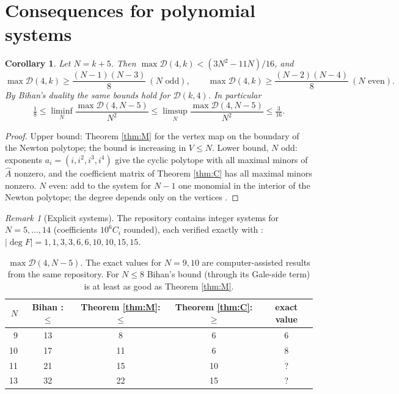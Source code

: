 \documentclass[11pt]{article}
\newtheorem{corollary}[theorem]{Corollary}
\theoremstyle{remark}
\newtheorem{remark}[theorem]{Remark}
\begin{document}
\section{Consequences for polynomial systems}
\begin{corollary}\label{cor}
Let $N=k+5$. Then $\max\mathcal D(4,k)<(3N^2-11N)/16$, and
\[
\max\mathcal D(4,k)\ge\frac{(N-1)(N-3)}{8}\ (N\text{ odd}),\qquad\max\mathcal D(4,k)\ge\frac{(N-2)(N-4)}{8}\ (N\text{ even}).
\]
By Bihan's duality \cite[Thm.~3]{B} the same bounds hold for $\mathcal D(k,4)$. In particular
\[\tfrac18\le\liminf_N\frac{\max\mathcal D(4,N-5)}{N^2}\le\limsup_N\frac{\max\mathcal D(4,N-5)}{N^2}\le\tfrac3{16}.\]
\end{corollary}
\begin{proof}
Upper bound: Theorem \ref{thm:M} for the vertex map on the boundary of the Newton polytope; the bound is increasing in $V\le N$. Lower bound, $N$ odd: exponents $a_i=(i,i^2,i^3,i^4)$ give the cyclic polytope with all maximal minors of $\hat A$ nonzero, and the coefficient matrix of Theorem \ref{thm:C} has all maximal minors nonzero. $N$ even: add to the system for $N-1$ one monomial in the interior of the Newton polytope; the degree depends only on the vertices \cite{D}.
\end{proof}

\begin{remark}[Explicit systems]
The repository contains integer systems for $N=5,\dots,14$ (coefficients $10^6C_i$ rounded), each verified exactly with \cite[Thm.~1.3]{B}: $|\deg F|=1,1,3,3,6,6,10,10,15,15$.
\end{remark}

\begin{table}[h]\centering
\begin{tabular}{rcccc}\toprule
$N$ & Bihan \cite{B}: $\le$ & Theorem \ref{thm:M}: $\le$ & Theorem \ref{thm:C}: $\ge$ & exact value\\\midrule
9 & 13 & 8 & 6 & 6\\
10 & 17 & 11 & 6 & 8\\
11 & 21 & 15 & 10 & ?\\
13 & 32 & 22 & 15 & ?\\\bottomrule
\end{tabular}
\caption{$\max\mathcal D(4,N-5)$. The exact values for $N=9,10$ are computer-assisted results from the same repository. For $N\le8$ Bihan's bound (through its Gale-side term) is at least as good as Theorem \ref{thm:M}.}
\end{table}
\end{document}
